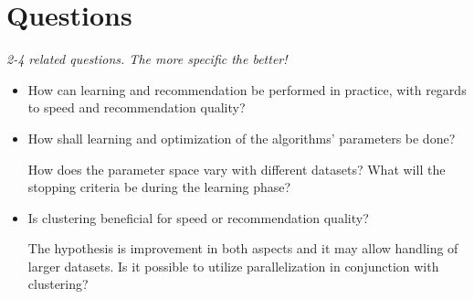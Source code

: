 
\section{Questions}\label{sec:intro:questions}

\textit{2-4 related questions. The more specific the better!}

\begin{itemize}
    \item How can learning and recommendation be performed in practice, with regards to speed and recommendation quality?

    \item How shall learning and optimization of the algorithms' parameters be done?

          How does the parameter space vary with different datasets? What will the stopping criteria be during the learning phase?

    \item Is clustering beneficial for speed or recommendation quality?

          The hypothesis is improvement in both aspects and it may allow handling of larger datasets.
          Is it possible to utilize parallelization in conjunction with clustering?
\end{itemize}

